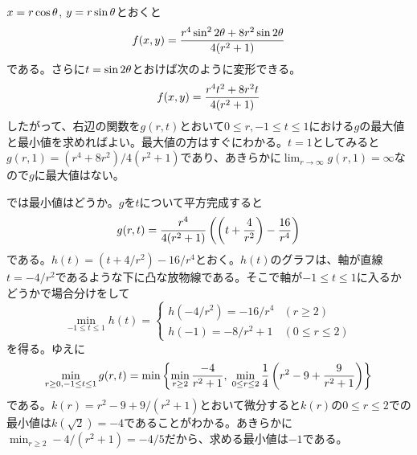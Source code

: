 \subsubsection{} %
\begin{sol}
  $x = r \cos {\theta}$, $y = r \sin {\theta}$とおくと
  \[
  f(x,y) = \frac{r^4 \sin^2 2{\theta}  + 8 r^2 \sin 2{\theta} }{4(r^2 +1)}
  \]
  である。さらに$t = \sin 2 {\theta}$とおけば次のように変形できる。
  \[
  f(x,y) = \frac{ r^4 t^2 + 8 r^2 t}{4(r^2 + 1)}
  \]
  したがって、右辺の関数を$g(r,t)$とおいて$0 \leq r, -1 \leq t \leq 1$における$g$の最大値と最小値を求めればよい。最大値の方はすぐにわかる。$t=1$としてみると$g(r,1)=(r^4 + 8r^2)/4(r^2 +1)$であり、あきらかに$\lim_{r \to \infty} g(r,1)=\infty$なので$g$に最大値はない。

  では最小値はどうか。$g$を$t$について平方完成すると
  \[
  g(r,t) = \frac{r^4 }{4(r^2 + 1)} \left( \left(t+ \frac{4}{r^2} \right) - \frac{16}{r^4} \right)
  \]
  である。$h(t)= (t+ 4/r^2) - 16/r^4$とおく。$h(t)$のグラフは、軸が直線$t = -4 / r^2$であるような下に凸な放物線である。そこで軸が$-1 \leq t \leq 1$に入るかどうかで場合分けをして
  \[
  \min_{-1 \leq t \leq 1} h(t) = \begin{cases}
  h(-4/r^2) = -16/r^4 &(r \geq 2) \\
  h(-1)= - 8/r^2 + 1 &(0 \leq r \leq 2)
\end{cases}
  \]
  を得る。ゆえに
  \[
  \min_{r \geq 0, -1 \leq t \leq 1} g(r,t) = \min \left\{ \min_{r \geq 2} \frac{-4}{r^2 +1} ,\; \min_{0 \leq r \leq 2} \frac{1}{4} \left( r^2 - 9 + \frac{9}{r^2+1} \right) \right\}
  \]
  である。$k(r) =  r^2 - 9 + 9/(r^2+1)$とおいて微分すると$k(r)$の$0 \leq r \leq 2$での最小値は$k(\sqrt{2}) = -4$であることがわかる。あきらかに$\min_{r \geq 2} -4/(r^2 +1) = -4/5$だから、求める最小値は$-1$である。
\end{sol}
